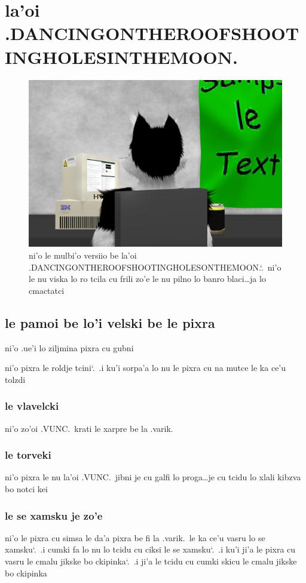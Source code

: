 \documentclass{report}
\newcommand\sds{\spacefactor\sfcode`.\ \space}
\begin{document}
\chapter{la'oi .DANCINGONTHEROOFSHOOTINGHOLESINTHEMOON.}
\begin{figure}[ht]
	\centering
	\includegraphics[width=\textwidth]{dancingontheroofshootingholesinthemoon/dancingontheroofshootingholesinthemoon.png}
	\caption[center]{ni'o le mulbi'o versiio be la'oi .DANCINGONTHEROOFSHOOTINGHOLESONTHEMOON.\sds  ni'o le nu viska lo ro tcila cu frili zo'e le nu pilno lo banro blaci\ldots ja lo cmactatci}
\end{figure}
\section{le pamoi be lo'i velski be le pixra}
ni'o .ue'i lo ziljmina pixra cu gubni

ni'o pixra le roldje tcini\sds  .i ku'i sorpa'a lo nu le pixra cu na mutce le ka ce'u tolzdi

\subsection{le vlavelcki}
ni'o zo'oi .VUNC.\ krati le xarpre be la .varik.
\subsection{le torveki}
ni'o pixra le nu la'oi .VUNC.\ jibni je cu galfi lo proga\ldots je cu tcidu lo xlali kibzva bo notci kei

\subsection{le se xamsku je zo'e}
ni'o le pixra cu simsa le da'a pixra be fi la .varik.\ le ka ce'u vasru lo se xamsku\sds  .i cumki fa lo nu lo tcidu cu ciksi le se xamsku\sds  .i ku'i ji'a le pixra cu vasru le cmalu jikske bo ckipinka\sds  .i ji'a le tcidu cu cumki skicu le cmalu jikske bo ckipinka
\end{document}
